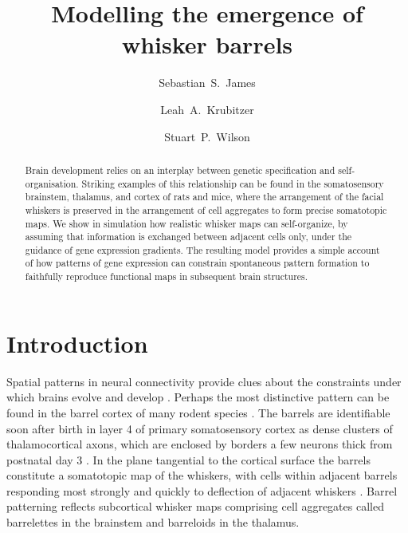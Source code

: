 \documentclass[9pt,lineno]{elife}
\title{Modelling the emergence of whisker barrels}
\author[1*]{Sebastian~S.~James}
\author[2]{Leah~A.~Krubitzer}
\author[1]{Stuart~P.~Wilson}
\affil[1]{Department of Psychology, The University of Sheffield, Sheffield, United Kingdom.}
\affil[2]{Center for Neuroscience, The University of California, Davis, United States.}
\begin{document}
\maketitle

\begin{abstract}
Brain development relies on an interplay between genetic specification and
self-organisation. Striking examples of this relationship can be found in the
somatosensory brainstem, thalamus, and cortex of rats and mice, where the
arrangement of the facial whiskers is preserved in the arrangement of cell
aggregates to form precise somatotopic maps. We show in simulation how
realistic whisker maps can self-organize, by assuming that information is
exchanged between adjacent cells only, under the guidance of gene expression
gradients. The resulting model provides a simple account of how patterns of
gene expression can constrain spontaneous pattern formation to faithfully
reproduce functional maps in subsequent brain structures.
\end{abstract}

\newcommand{\cmnt}[1]{\textcolor{blue}{#1}}
\newcommand{\dvrg}{\nabla\vcdot\nabla}
\newcommand{\e}{\emph}
\newcommand{\bol}{\textbf}
\newcommand{\mb}[1]{\mathbf{#1}}
\makeatletter
\newcommand*\vcdot{\mathpalette\vcdot@{.35}}
\newcommand*\vcdot@[2]{\mathbin{\vcenter{\hbox{\scalebox{#2}{$\m@th#1\bullet$}}}}}

\section{Introduction}

Spatial patterns in neural connectivity provide clues about the constraints
under which brains evolve and develop \citep{purves_iterated_1992}. Perhaps
the most distinctive pattern can be found in the barrel cortex of many rodent
species \cite{woolsey_structural_1970}. The barrels are identifiable soon
after birth in layer 4 of primary somatosensory cortex as dense clusters of
thalamocortical axons, which are enclosed by borders a few neurons thick from
postnatal day 3 \citep{erzurumlu_development_2012}. In the plane tangential to
the cortical surface the barrels constitute a somatotopic map of the whiskers,
with cells within adjacent barrels responding most strongly and quickly to
deflection of adjacent whiskers \citep{armstrong-james_flow_1992}. Barrel
patterning reflects subcortical whisker maps comprising cell aggregates called
barrelettes in the brainstem and barreloids in the thalamus.
\end{document}
